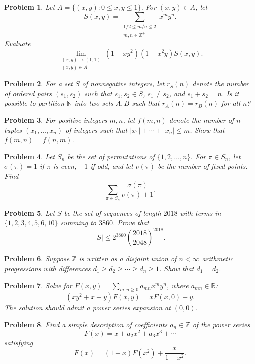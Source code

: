 \documentclass[12pt]{article}
\newtheorem{problem}{Problem}
\begin{document}
\begin{problem}
Let $A = \{(x,y): 0 \leq x,y \leq 1\}$. For $(x,y) \in A$, let
\[
S(x,y) = \sum_{\substack{1/2 \leq m/n \leq 2 \\ m,n \in \mathbb{Z}^+}} x^m y^n.
\]
Evaluate
\[
\lim_{\substack{(x,y) \to (1,1) \\ (x,y) \in A}} (1-xy^2)(1-x^2y) S(x,y).
\]
\end{problem}

\begin{problem}
For a set $S$ of nonnegative integers, let $r_S(n)$ denote the number of ordered pairs $(s_1,s_2)$ such that $s_1,s_2 \in S$, $s_1 \neq s_2$, and $s_1+s_2=n$. Is it possible to partition $\mathbb{N}$ into two sets $A,B$ such that $r_A(n)=r_B(n)$ for all $n$?
\end{problem}

\begin{problem}
For positive integers $m,n$, let $f(m,n)$ denote the number of $n$-tuples $(x_1,\dots,x_n)$ of integers such that $|x_1|+\cdots+|x_n| \leq m$. Show that $f(m,n)=f(n,m)$.
\end{problem}

\begin{problem}
Let $S_n$ be the set of permutations of $\{1,2,\dots,n\}$. For $\pi \in S_n$, let $\sigma(\pi)=1$ if $\pi$ is even, $-1$ if odd, and let $\nu(\pi)$ be the number of fixed points. Find
\[
\sum_{\pi \in S_n} \frac{\sigma(\pi)}{\nu(\pi)+1}.
\]
\end{problem}

\begin{problem}
Let $S$ be the set of sequences of length $2018$ with terms in $\{1,2,3,4,5,6,10\}$ summing to $3860$. Prove that
\[
|S| \leq 2^{3860} \binom{2018}{2048}^{2018}.
\]
\end{problem}

\begin{problem}
Suppose $\mathbb{Z}$ is written as a disjoint union of $n < \infty$ arithmetic progressions with differences $d_1 \geq d_2 \geq \cdots \geq d_n \geq 1$. Show that $d_1 = d_2$.
\end{problem}

\begin{problem}
Solve for $F(x,y) = \sum_{m,n \geq 0} a_{mn} x^m y^n$, where $a_{mn} \in \mathbb{R}$:
\[
(xy^2 + x - y)F(x,y) = xF(x,0) - y.
\]
The solution should admit a power series expansion at $(0,0)$.
\end{problem}

\begin{problem}
Find a simple description of coefficients $a_n \in \mathbb{Z}$ of the power series
\[
F(x) = x + a_2 x^2 + a_3 x^3 + \cdots
\]
satisfying
\[
F(x) = (1+x)F(x^2) + \frac{x}{1-x^2}.
\]
\end{problem}
\end{document}
